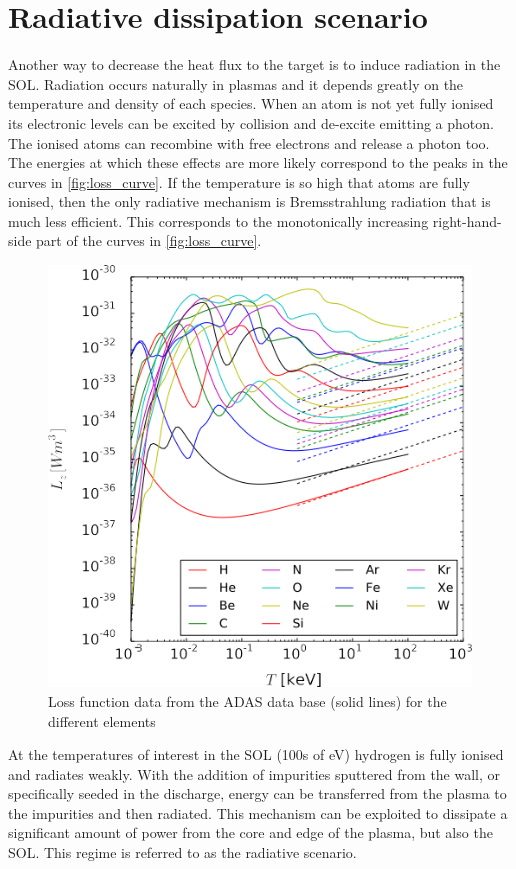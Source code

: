 \section{Radiative dissipation scenario}\label{Radiative dissipation scenario}

Another way to decrease the heat flux to the target is to induce radiation in the SOL.
Radiation occurs naturally in plasmas and it depends greatly on the temperature and density of each species. When an atom is not yet fully ionised its electronic levels can be excited by collision and de-excite emitting a photon. The ionised atoms can recombine with free electrons and release a photon too. The energies at which these effects are more likely correspond to the peaks in the curves in \autoref{fig:loss_curve}. If the temperature is so high that atoms are fully ionised, then the only radiative mechanism is Bremsstrahlung radiation that is much less efficient. This corresponds to the monotonically increasing right-hand-side part of the curves in \autoref{fig:loss_curve}.

\begin{figure}[!ht]
	\centering
	\includegraphics[width=0.7\linewidth]{Chapters/chapter1/figs/loss curve.png}
	\caption{Loss function data from the ADAS data base (solid lines) for the different elements \cite{Lux2015}}
	\label{fig:loss_curve}
\end{figure}

At the temperatures of interest in the SOL (100s of eV\cite{Pacher2011}) hydrogen is fully ionised and radiates weakly. With the addition of impurities sputtered from the wall, or specifically seeded in the discharge, energy can be transferred from the plasma to the impurities and then radiated. This mechanism can be exploited to dissipate a significant amount of power from the core and edge of the plasma, but also the SOL. This regime is referred to as the radiative scenario.



